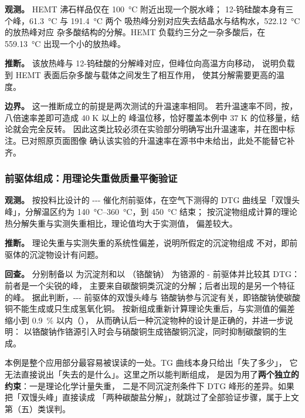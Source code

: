 \begin{dataflow}
\textbf{观测。} HEMT 沸石样品仅在 \qty{100}{\celsius} 附近出现一个脱水峰；
12-钨硅酸本身有三个峰，\qty{61.3}{\celsius} 与 \qty{191.4}{\celsius} 两个
吸热峰分别对应失去结晶水与结构水，\qty{522.12}{\celsius} 的放热峰对应
杂多酸结构的分解。HEMT 负载约三分之一杂多酸后，在 \qty{559.13}{\celsius}
出现一个小的放热峰。

\textbf{推断。} 该放热峰与 12-钨硅酸的分解峰对应，但峰位向高温方向移动，
说明负载到 HEMT 表面后杂多酸与载体之间发生了相互作用，
使其分解需要更高的温度。

\textbf{边界。} 这一推断成立的前提是两次测试的升温速率相同。
若升温速率不同，按，八倍速率差即可造成 40 K 以上的
峰温位移，恰好覆盖本例中 37 K 的位移量，结论就会完全反转。
因此这类比较必须在实验部分明确写出升温速率，并在图中标注。已对照原页面图像
确认该实验的升温速率在源书中未给出，此处不能替它补齐。
\end{dataflow}

\subsubsection{前驱体组成：用理论失重做质量平衡验证}

\begin{dataflow}
\textbf{观测。} 按投料比设计的 ---
催化剂前驱体，在空气下测得的 DTG 曲线呈「双馒头峰」，分解温区约为
\qty{140}{\celsius}--\qty{360}{\celsius}，到 \qty{450}{\celsius} 结束；
按沉淀物组成计算的理论热分解失重与实测失重相比，理论值均大于实测值，
偏差较大。

\textbf{推断。} 理论失重与实测失重的系统性偏差，说明所假定的沉淀物组成
不对，即前驱体的沉淀物设计有问题。

\textbf{回查。} 分别制备以  为沉淀剂和以 （铬酸钠）
为铬源的 - 前驱体并比较其 DTG：前者是一个尖锐的峰，
主要来自碳酸铜类沉淀的分解；后者出现的是另一个特征的峰。
据此判断，--- 前驱体的双馒头峰与
铬酸钠参与沉淀有关，即铬酸钠使碳酸铜不能生成或只生成氢氧化铜。
按新组成重新计算理论失重后，与实测值的偏差缩小到 \qty{0.9}{\percent}
以内（），
从而确认后一种沉淀物种的设计是正确的，并进一步说明：
以铬酸钠作铬源引入时会与硝酸铜生成铬酸铜沉淀，同时抑制碳酸铜的生成。
\end{dataflow}

\begin{pitfall}
本例是整个应用部分最容易被误读的一处。TG 曲线本身只给出「失了多少」，
它无法直接说出「失去的是什么」。这里之所以能判断组成，
是因为用了\textbf{两个独立的约束}：一是理论化学计量失重，
二是不同沉淀剂条件下 DTG 峰形的差异。如果把「双馒头峰」直接读成
「两种碳酸盐分解」，就跳过了全部验证步骤，属于上文第（五）类误判。
\end{pitfall}

